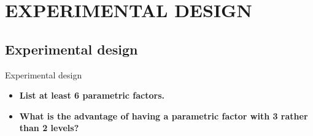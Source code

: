 \documentclass{beamer}
\begin{document}


\section{EXPERIMENTAL DESIGN}


\subsection[Experimental design]{Experimental design}


\begin{frame}{Experimental design}
  \begin{itemize}  
    \item \textbf{List at least 6 parametric factors.}


    \bigskip
    \item \textbf{What is the advantage of having a parametric factor with 3 rather than 2 levels?}



  \end{itemize}
\end{frame}




% 
\end{document}
